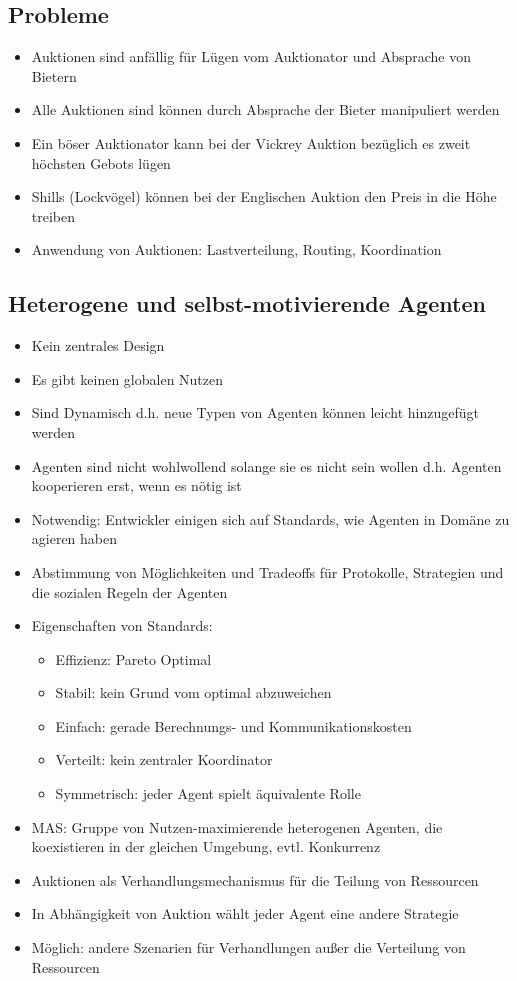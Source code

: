 \documentclass{article} %
\begin{document}
	\subsection{Probleme}
	\begin{itemize}
		\item Auktionen sind anfällig für Lügen vom Auktionator und Absprache von Bietern
		\item Alle Auktionen sind können durch Absprache der Bieter manipuliert werden 
		\item Ein böser Auktionator kann bei der Vickrey Auktion bezüglich es zweit höchsten Gebots lügen
		\item Shills (Lockvögel) können bei der Englischen Auktion den Preis in die Höhe treiben
		\item Anwendung von Auktionen: Lastverteilung, Routing, Koordination
	\end{itemize}
	\subsection{Heterogene und selbst-motivierende Agenten}
	\begin{itemize}
		\item Kein zentrales Design
		\item Es gibt keinen globalen Nutzen
		\item Sind Dynamisch d.h. neue Typen von Agenten können leicht hinzugefügt werden
		\item Agenten sind nicht wohlwollend solange sie es nicht sein wollen d.h. Agenten kooperieren erst, wenn es nötig ist
		\item Notwendig: Entwickler einigen sich auf Standards, wie Agenten in Domäne zu agieren haben
		\item Abstimmung von Möglichkeiten und Tradeoffs für Protokolle, Strategien und die sozialen Regeln der Agenten
		\item Eigenschaften von Standards:
		\begin{itemize}
			\item Effizienz: Pareto Optimal
			\item Stabil: kein Grund vom optimal abzuweichen
			\item Einfach: gerade Berechnungs- und Kommunikationskosten
			\item Verteilt: kein zentraler Koordinator
			\item Symmetrisch: jeder Agent spielt äquivalente Rolle
		\end{itemize}
		\item MAS: Gruppe von Nutzen-maximierende heterogenen Agenten, die koexistieren in der gleichen Umgebung, evtl. Konkurrenz
		\item Auktionen als Verhandlungsmechanismus für die Teilung von Ressourcen
		\item In Abhängigkeit von Auktion wählt jeder Agent eine andere Strategie
		\item Möglich: andere Szenarien für Verhandlungen außer die Verteilung von Ressourcen
	\end{itemize}
\end{document}
